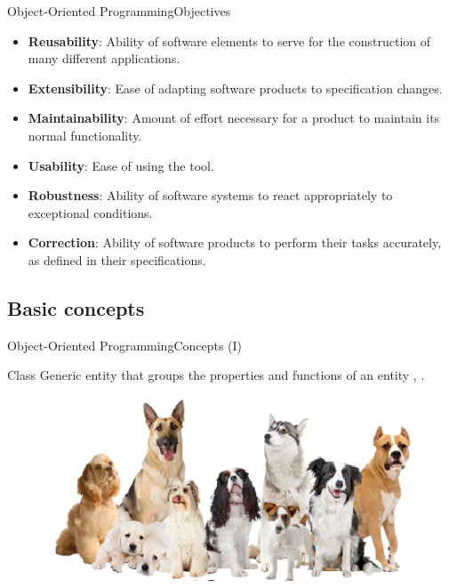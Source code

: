 \documentclass[10pt,compress]{beamer} %
\begin{document}
\begin{frame}{Object-Oriented Programming}{Objectives}
\begin{itemize}
  	\item \textbf{Reusability}: Ability of software elements to serve for the construction of many different applications.
  	\item \textbf{Extensibility}: Ease of adapting software products to specification changes.
  	\item \textbf{Maintainability}: Amount of effort necessary for a product to maintain its normal functionality.   
  	\item \textbf{Usability}: Ease of using the tool.
  	\item \textbf{Robustness}: Ability of software systems to react appropriately to exceptional conditions.   
  	\item \textbf{Correction}: Ability of software products to perform their tasks accurately, as defined in their specifications.
  	\end{itemize} 	
\end{frame}

\subsection{Basic concepts}

\begin{frame}{Object-Oriented Programming}{Concepts (I)}
	\begin{block}{Class}
		 Generic entity that groups the properties and functions of an entity \cite{Downey}, \cite{vanRossum}.     
  	\end{block}	
		\begin{figure}
			\includegraphics[scale=0.5]{figs/clase}	
		\end{figure}				
\end{frame}
\end{document}
